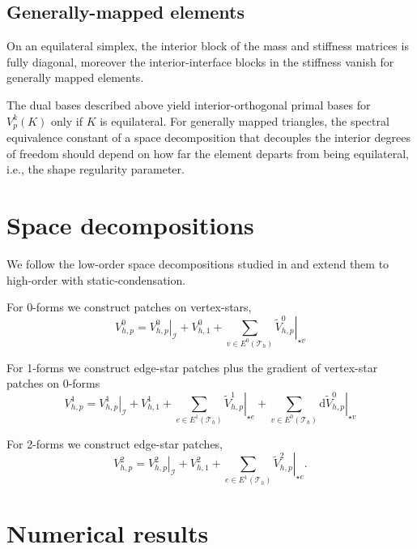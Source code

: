 \documentclass[review,onefignum,onetabnum,a4paper]{siamart190516}
\newcommand{\mesh}{\mathcal{T}_h}
\begin{document}
\subsection{Generally-mapped elements}

On an equilateral simplex, the interior block of the mass and stiffness matrices
is fully diagonal, moreover the interior-interface blocks in the stiffness 
vanish for generally mapped elements.

The dual bases described above yield interior-orthogonal primal bases for $V^k_p(K)$ only
if $K$ is equilateral. For generally mapped triangles, the spectral equivalence constant of
a space decomposition that decouples the interior degrees of freedom should depend on how
far the element departs from being equilateral, i.e., the shape regularity parameter. 



\section{Space decompositions}


We follow 
the low-order space decompositions studied in \cite{arnold00}
and extend them to high-order with static-condensation.

For 0-forms we construct patches on vertex-stars,
\begin{equation}
   V^0_{h,p} = \left.V^0_{h,p}\right|_\mathcal{I} + V^0_{h,1} 
   + \sum_{v\in E^0(\mesh)} \left.\tilde{V}^0_{h,p}\right|_{\star v} 
\end{equation}

For 1-forms we construct edge-star patches
plus the gradient of vertex-star patches on 0-forms
\begin{equation}
   V^1_{h,p} = \left.V^1_{h,p}\right|_\mathcal{I} +  V^1_{h,1}
   + \sum_{e\in E^1(\mesh)} \left.\tilde{V}^1_{h,p}\right|_{\star e} 
   + \sum_{v\in E^0(\mesh)} \mathrm{d} \left.\tilde{V}^0_{h,p}\right|_{\star v} 
\end{equation}

For 2-forms we construct edge-star patches,
\begin{equation}
   V^2_{h,p} = \left.V^2_{h,p}\right|_\mathcal{I} +  V^2_{h,1} 
   + \sum_{e\in E^1(\mesh)} \left.\tilde{V}^2_{h,p}\right|_{\star e}. 
\end{equation}



\section{Numerical results} \label{sec:results}
\end{document}

